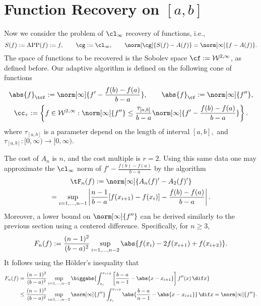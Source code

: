 \documentclass[]{elsarticle}
\DeclareMathOperator{\APP}{APP}
\theoremstyle{definition}
\theoremstyle{remark}
\newcommand{\Fnorm}[1]{\abs{#1}_{\cf}}
\newcommand{\Ftnorm}[1]{\abs{#1}_{\tcf}}
\begin{document}
\section{Function Recovery on $[a,b]$}

Now we consider the problem of $\cl_{\infty}$ recovery of functions, i.e.,
\[
S(f):=\APP(f):=f, \qquad \cg:=\cl_{\infty}, \qquad \norm[\cg]{S(f)-A(f)}=\norm[\infty]{f-A(f)}.
\]
The space of functions to be recovered is the Sobolev space $\cf := \mathcal{W}^{2,\infty}$, as defined before.  Our adaptive algorithm is defined on the following cone of functions
\begin{subequations} \label{coneappxdef}
\begin{gather}
\Ftnorm{f}:=\norm[\infty]{f'-\frac{f(b)-f(a)}{b-a}}, \qquad \Fnorm{f}:=\norm[\infty]{f''}, \\
\cc_{\tau}:=\left\{f \in  \mathcal{W}^{2,\infty} : \norm[\infty]{f''}\leq \frac{\tau_{[a,b]}}{b-a} \norm[\infty]{f'-\frac{f(b)-f(a)}{b-a}}\right\}.
\end{gather}
\end{subequations}
where $\tau_{[a,b]}$ is a parameter depend on the length of interval $[a,b],$ and $\tau_{[a,b]}: [0, \infty) \rightarrow [0, \infty).$

The cost of $A_n$ is $n$, and the cost multiple is $r=2$.
Using this same data one may approximate the $\cl_\infty$ norm of $f'-\frac{f(b)-f(a)}{b-a}$ by the algorithm
\begin{multline}\label{estfirstderiv}
\tF_n(f) := \norm[\infty]{A_n(f)' - A_2(f)'} \\
= \sup_{i=1, \ldots, n-1} \left|\frac{n-1}{b-a} [f(x_{i+1})-f(x_i)]-\frac{f(b)-f(a)}{b-a}\right|.
\end{multline}
Moreover, a lower bound on $\norm[\infty]{f''}$ can be derived similarly to the previous section using a centered difference.  Specifically, for $n \ge 3$,
\begin{equation} \label{Fnormappxalg}
F_n(f) := \frac{(n-1)^2}{(b-a)^2}\sup_{i=1, \ldots, n-2} \abs{f(x_i) - 2 f(x_{i+1})+f(x_{i+2})}.
\end{equation}
It follows using the H\"older's inequality that
\begin{align*}
F_n(f) &= \frac{(n-1)^2}{(b-a)^2}\sup_{i=1, \ldots, n-2} \biggabs{\int_{x_i}^{x_{i+2}} \left[\frac{b-a}{n-1} - \abs{x-x_{i+1}}\right] f''(x) \, \dif x} \\
&\le \frac{(n-1)^2}{(b-a)^2}\sup_{i=1, \ldots, n-2} \norm[\infty]{f''} \int_{x_i}^{x_{i+2}} \abs{\frac{b-a}{n-1} - \abs{x-x_{i+1}}} \, \dif x = \norm[\infty]{f''}.
\end{align*}
\end{document}
